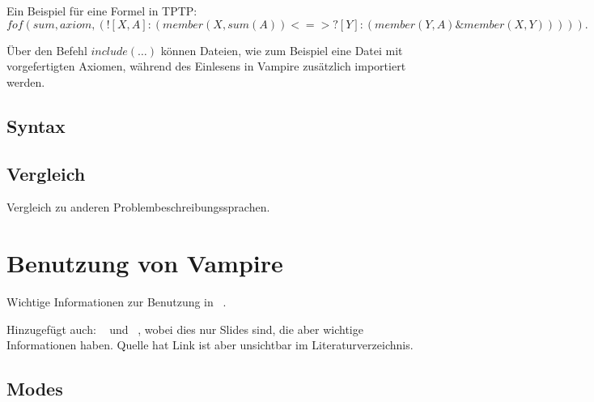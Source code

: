 \documentclass{acm_proc_article-sp-german}
\begin{document}
Ein Beispiel für eine Formel in TPTP:\\
$fof(sum, axiom, ( ! [X,A] :( member(X,sum(A)) <=> ? [Y] : ( member(Y,A)  \&  member(X,Y))))).$

Über den Befehl $include(\dots)$ können Dateien, wie zum Beispiel eine Datei mit vorgefertigten Axiomen, während des Einlesens in Vampire zusätzlich importiert werden.

\subsection{Syntax}
\label{subsec:syntax}

\subsection{Vergleich}
\label{subsec:tptpcomp}
Vergleich zu anderen Problembeschreibungssprachen.


\section{Benutzung von Vampire}
\label{sec:invocation}

Wichtige Informationen zur Benutzung in ~\cite{hoder2011slides}.

Hinzugefügt auch: ~\cite{kovacs2011slides} und ~\cite{hodervoronkov2012slides}, wobei dies nur Slides sind, die aber wichtige Informationen haben. Quelle hat Link ist aber unsichtbar im Literaturverzeichnis.

\subsection{Modes}
\label{subsec:modes}
\end{document}
